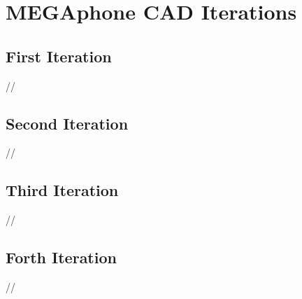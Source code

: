 
\chapter{MEGAphone CAD Iterations} %

\label{AppendixC} %

\clearpage

\section{First Iteration}
//
\newpage

\section{Second Iteration}
//
\newpage

\section{Third Iteration}
//
\newpage

\section{Forth Iteration}
//
\newpage